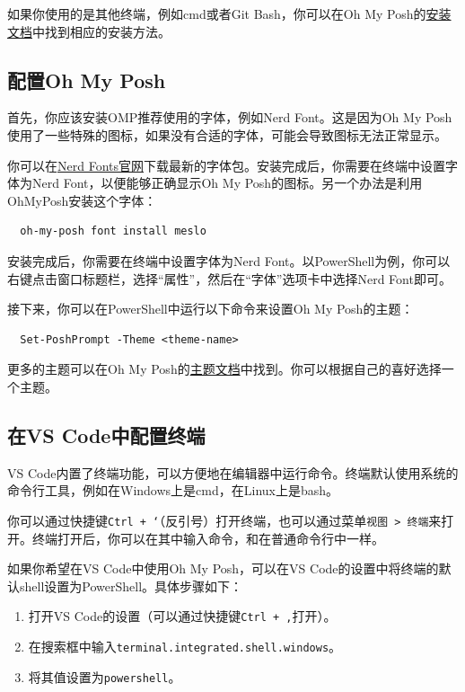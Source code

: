 \documentclass[../main.tex]{subfiles}
\begin{document}
如果你使用的是其他终端，例如cmd或者Git Bash，你可以在Oh My Posh的\href{https://ohmyposh.dev/docs/installation}{安装文档}中找到相应的安装方法。

\subsection{配置Oh My Posh}

首先，你应该安装OMP推荐使用的字体，例如Nerd Font。这是因为Oh My Posh使用了一些特殊的图标，如果没有合适的字体，可能会导致图标无法正常显示。

你可以在\href{https://www.nerdfonts.com/}{Nerd Fonts官网}下载最新的字体包。安装完成后，你需要在终端中设置字体为Nerd Font，以便能够正确显示Oh My Posh的图标。另一个办法是利用OhMyPosh安装这个字体：
\begin{verbatim}
  oh-my-posh font install meslo
\end{verbatim}

安装完成后，你需要在终端中设置字体为Nerd Font。以PowerShell为例，你可以右键点击窗口标题栏，选择“属性”，然后在“字体”选项卡中选择Nerd Font即可。

接下来，你可以在PowerShell中运行以下命令来设置Oh My Posh的主题：
\begin{verbatim}
  Set-PoshPrompt -Theme <theme-name>
\end{verbatim}

更多的主题可以在Oh My Posh的\href{https://ohmyposh.dev/docs/themes}{主题文档}中找到。你可以根据自己的喜好选择一个主题。 

\subsection{在VS Code中配置终端}

VS Code内置了终端功能，可以方便地在编辑器中运行命令。终端默认使用系统的命令行工具，例如在Windows上是cmd，在Linux上是bash。

你可以通过快捷键\texttt{Ctrl + `}（反引号）打开终端，也可以通过菜单\texttt{视图 > 终端}来打开。终端打开后，你可以在其中输入命令，和在普通命令行中一样。

如果你希望在VS Code中使用Oh My Posh，可以在VS Code的设置中将终端的默认shell设置为PowerShell。具体步骤如下：

\begin{enumerate}
  \item 打开VS Code的设置（可以通过快捷键\texttt{Ctrl + ,}打开）。
  \item 在搜索框中输入\texttt{terminal.integrated.shell.windows}。
  \item 将其值设置为\texttt{powershell}。
\end{enumerate}
\end{document}

